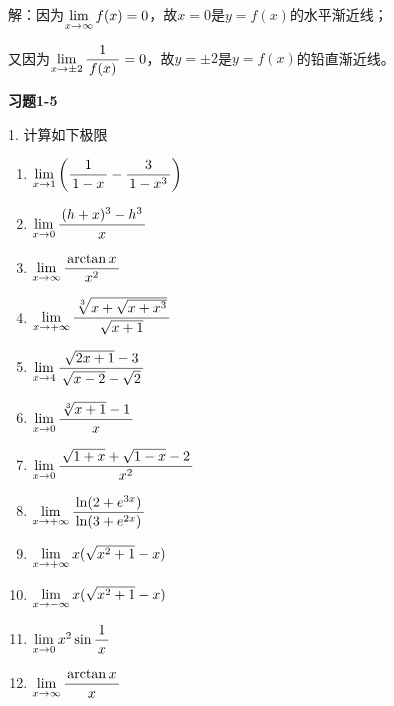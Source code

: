 解：因为$\limx{\infty}f(x)=0$，故$x=0$是$y=f(x)$的水平渐近线；

又因为$\limx{\pm2}\df1{f(x)}=0$，故$y=\pm2$是$y=f(x)$的铅直渐近线。\fin

\bigskip

\begin{center}
	\bf 习题1-5
\end{center}

1. 计算如下极限
\begin{enumerate}[(1)]
	\setlength{\itemindent}{1cm}
    \item $\limx{1}\left(\df1{1-x}-\df3{1-x^3}\right)$
    \item $\limx0\df{(h+x)^3-h^3}x$
    \item $\limx{\infty}\df{\arctan x}{x^2}$
    \item $\limx{+\infty}\df{\sqrt[3]{x+\sqrt{x+x^3}}}{\sqrt{x+1}}$
    \item $\limx4\df{\sqrt{2x+1}-3}{\sqrt{x-2}-\sqrt2}$
    \item $\limx0\df{\sqrt[3]{x+1}-1}x$
    \item $\limx0\df{\sqrt{1+x}+\sqrt{1-x}-2}{x^2}$
    \item $\limx{+\infty}\df{\ln(2+e^{3x})}{\ln(3+e^{2x})}$
    \item $\limx{+\infty}x(\sqrt{x^2+1}-x)$
    \item $\limx{-\infty}x(\sqrt{x^2+1}-x)$
    \item $\limx0x^2\sin\df1x$
    \item $\limx{\infty}\df{\arctan x}x$
\end{enumerate}

